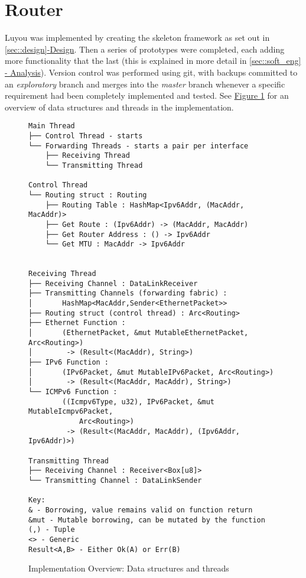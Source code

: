 \documentclass[12pt,a4paper,twoside,openany]{report}
\begin{document}
\pagebreak

\section{Router}
\label{sec::router}

Luyou was implemented by creating the skeleton framework as set out in \ref{sec::design}\hyperref[sec::design]{-Design}.  Then a series of prototypes were completed, each adding more functionality that the last (this is explained in more detail in \ref{sec::soft_eng}\hyperref[sec::soft_eng]{ - Analysis}).  Version control was performed using git\cite{git}, with backups committed to an \textit{exploratory} branch and merges into the \textit{master} branch whenever a specific requirement had been completely implemented and tested.  See \hyperref[fig::implementation_overview]{Figure }\ref{fig::implementation_overview} for an overview of data structures and threads in the implementation.

\begin{figure}
\begin{lstlisting}[style=tree]
Main Thread
├── Control Thread - starts
└── Forwarding Threads - starts a pair per interface
    ├── Receiving Thread 
    └── Transmitting Thread

Control Thread
└── Routing struct : Routing
    ├── Routing Table : HashMap<Ipv6Addr, (MacAddr, MacAddr)>
    ├── Get Route : (Ipv6Addr) -> (MacAddr, MacAddr)
    ├── Get Router Address : () -> Ipv6Addr
    └── Get MTU : MacAddr -> Ipv6Addr
    

Receiving Thread
├── Receiving Channel : DataLinkReceiver
├── Transmitting Channels (forwarding fabric) : 
│       HashMap<MacAddr,Sender<EthernetPacket>>
├── Routing struct (control thread) : Arc<Routing>
├── Ethernet Function : 
│       (EthernetPacket, &mut MutableEthernetPacket, Arc<Routing>)
│        -> (Result<(MacAddr), String>)
├── IPv6 Function :
│       (IPv6Packet, &mut MutableIPv6Packet, Arc<Routing>)
│        -> (Result<(MacAddr, MacAddr), String>)
└── ICMPv6 Function :
        ((Icmpv6Type, u32), IPv6Packet, &mut MutableIcmpv6Packet, 
            Arc<Routing>) 
         -> (Result<(MacAddr, MacAddr), (Ipv6Addr, Ipv6Addr)>)

Transmitting Thread
├── Receiving Channel : Receiver<Box[u8]>
└── Transmitting Channel : DataLinkSender

Key:
& - Borrowing, value remains valid on function return
&mut - Mutable borrowing, can be mutated by the function
(,) - Tuple
<> - Generic
Result<A,B> - Either Ok(A) or Err(B)
\end{lstlisting}
\caption{Implementation Overview: Data structures and threads}
\label{fig::implementation_overview}
\end{figure}
\end{document}
